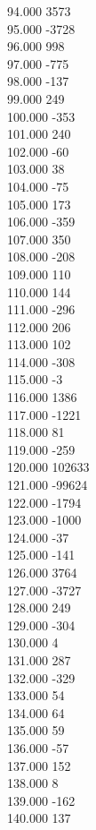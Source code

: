 { 94.000	3573 \\
 95.000	-3728 \\
 96.000	998 \\
 97.000	-775 \\
 98.000	-137 \\
 99.000	249 \\
 100.000	-353 \\
 101.000	240 \\
 102.000	-60 \\
 103.000	38 \\
 104.000	-75 \\
 105.000	173 \\
 106.000	-359 \\
 107.000	350 \\
 108.000	-208 \\
 109.000	110 \\
 110.000	144 \\
 111.000	-296 \\
 112.000	206 \\
 113.000	102 \\
 114.000	-308 \\
 115.000	-3 \\
 116.000	1386 \\
 117.000	-1221 \\
 118.000	81 \\
 119.000	-259 \\
 120.000	102633 \\
 121.000	-99624 \\
 122.000	-1794 \\
 123.000	-1000 \\
 124.000	-37 \\
 125.000	-141 \\
 126.000	3764 \\
 127.000	-3727 \\
 128.000	249 \\
 129.000	-304 \\
 130.000	4 \\
 131.000	287 \\
 132.000	-329 \\
 133.000	54 \\
 134.000	64 \\
 135.000	59 \\
 136.000	-57 \\
 137.000	152 \\
 138.000	8 \\
 139.000	-162 \\
 140.000	137 \\
}
